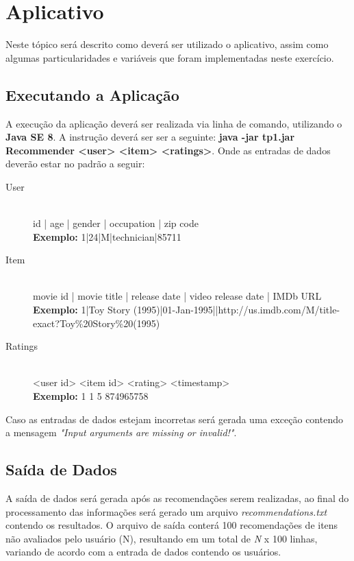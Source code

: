 \documentclass[12pt]{article}
\begin{document}
\section{Aplicativo} \label{sec:aplicativo}

Neste tópico será descrito como deverá ser utilizado o aplicativo, assim como algumas particularidades e variáveis que foram implementadas neste exercício.

\subsection{Executando a Aplicação}

A execução da aplicação deverá ser realizada via linha de comando, utilizando o \textbf{Java SE 8}. A instrução deverá ser ser a seguinte: \textbf{java -jar tp1.jar Recommender <user> <item> <ratings>}. Onde as entradas de dados deverão estar no padrão a seguir:
\vspace{5 mm}
\begin{description}
\item[User] \hfill \\
id | age | gender | occupation | zip code \\
\textbf{Exemplo:} 1|24|M|technician|85711
\item[Item] \hfill \\
movie id | movie title | release date | video release date | IMDb URL \\
\textbf{Exemplo:} 1|Toy Story (1995)|01-Jan-1995||http://us.imdb.com/M/title-exact?Toy\%20Story\%20(1995)
\item[Ratings] \hfill \\
<user id> <item id> <rating> <timestamp> \\
\textbf{Exemplo:} 1 1 5 874965758

\end{description}
\vspace{5 mm}
\noindent
Caso as entradas de dados estejam incorretas será gerada uma exceção contendo a mensagem \textit{"Input arguments are missing or invalid!"}.

\subsection{Saída de Dados}

A saída de dados será gerada após as recomendações serem realizadas, ao final do processamento das informações será gerado um arquivo \textit{recommendations.txt} contendo os resultados. O arquivo de saída conterá 100 recomendações de itens não avaliados pelo usuário (N), resultando em um total de \textit{N} x 100 linhas, variando de acordo com a entrada de dados contendo os usuários. 
\end{document}

